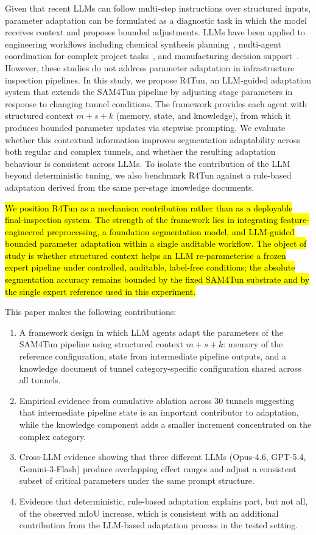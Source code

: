 \documentclass[a4paper,fleqn]{cas-dc}
\begin{document}
Given that recent LLMs can follow multi-step instructions over structured inputs, parameter adaptation can be formulated as a diagnostic task in which the model receives context and proposes bounded adjustments. LLMs have been applied to engineering workflows including chemical synthesis planning~\citep{bran2024chemcrow}, multi-agent coordination for complex project tasks~\citep{qian2024chatdev, hong2024metagpt, chen2024comm}, and manufacturing decision support~\citep{garcia2024manufacturing}. However, these studies do not address parameter adaptation in infrastructure inspection pipelines. In this study, we propose R4Tun, an LLM-guided adaptation system that extends the SAM4Tun pipeline by adjusting stage parameters in response to changing tunnel conditions. The framework provides each agent with structured context $m+s+k$ (memory, state, and knowledge), from which it produces bounded parameter updates via stepwise prompting. We evaluate whether this contextual information improves segmentation adaptability across both regular and complex tunnels, and whether the resulting adaptation behaviour is consistent across LLMs. To isolate the contribution of the LLM beyond deterministic tuning, we also benchmark R4Tun against a rule-based adaptation derived from the same per-stage knowledge documents.

\hl{We position R4Tun as a mechanism contribution rather than as a deployable final-inspection system. The strength of the framework lies in integrating feature-engineered preprocessing, a foundation segmentation model, and LLM-guided bounded parameter adaptation within a single auditable workflow. The object of study is whether structured context helps an LLM re-parameterise a frozen expert pipeline under controlled, auditable, label-free conditions; the absolute segmentation accuracy remains bounded by the fixed SAM4Tun substrate and by the single expert reference used in this experiment.}

This paper makes the following contributions:
\begin{enumerate}
\item A framework design in which LLM agents adapt the parameters of the SAM4Tun pipeline using structured context $m+s+k$: memory of the reference configuration, state from intermediate pipeline outputs, and a knowledge document of tunnel category-specific configuration shared across all tunnels.
\item Empirical evidence from cumulative ablation across 30 tunnels suggesting that intermediate pipeline state is an important contributor to adaptation, while the knowledge component adds a smaller increment concentrated on the complex category.
\item Cross-LLM evidence showing that three different LLMs (Opus-4.6, GPT-5.4, Gemini-3-Flash) produce overlapping effect ranges and adjust a consistent subset of critical parameters under the same prompt structure.
\item Evidence that deterministic, rule-based adaptation explains part, but not all, of the observed mIoU increase, which is consistent with an additional contribution from the LLM-based adaptation process in the tested setting.
\end{enumerate}
\end{document}
